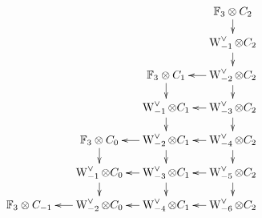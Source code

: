 
\[
	\xymatrix@R=.4cm@C=.4cm{
		\phantom{W_4 \ot C_{-1}} &
		\phantom{W_4 \ot C_{-1}} &
		\phantom{W_4 \ot C_{0}} &
		\phantom{W_4 \ot C_{1}} &
		\bF_3 \ot C_{2}\ar[d]
		\\
		\phantom{W_3 \ot C_{-1}} &
		\phantom{W_3 \ot C_{-1}} &
		\phantom{W_3 \ot C_{0}} &
		\phantom{W_3 \ot C_{1}} &
		\rWd[-1] \ot C_{2}\ar[d]
		\\
		\phantom{W_2 \ot C_{-1}} &
		\phantom{W_2 \ot C_{-1}} &
		\phantom{W_2 \ot C_{0}} &
		\bF_3 \ot C_{1}\ar[d] &
		\rWd[-2] \ot C_{2}\ar[d]\ar[l]
		\\
		\phantom{W_1 \ot C_{-1}} &
		\phantom{W_1 \ot C_{-1}}&
		\phantom{W_1 \ot C_{0}} &
		\rWd[-1] \ot C_{1}\ar[d] &
		\rWd[-3] \ot C_{2}\ar[d]\ar[l]
		\\
		\phantom{W_0 \ot C_{-1}} &
		\phantom{W_0 \ot C_{-1}}&
		\bF_3 \ot C_{0}\ar[d] &
		\rWd[-2] \ot C_{1}\ar[d]\ar[l] &
		\rWd[-4] \ot C_{2}\ar[d]\ar[l]
		\\
		\phantom{\rWd[-1] \ot C_{-1}} &
		\phantom{\rWd[-1] \ot C_{-1}} &
		\rWd[-1] \ot C_{0}\ar[d] &
		\rWd[-3] \ot C_{1}\ar[d]\ar[l] &
		\rWd[-5] \ot C_{2}\ar[d]\ar[l]
		\\
		\phantom{\rWd[-2] \ot C_{-1}} &
		\bF_3 \ot C_{-1} &
		\rWd[-2] \ot C_{0}\ar[l] &
		\rWd[-4] \ot C_{1}\ar[l] &
		\rWd[-6] \ot C_{2}\ar[l]
}
\]
